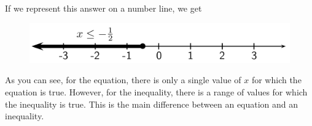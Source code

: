       \label{m39254*id157764}If we represent this answer on a number line, we get\par 
      \label{m39254*id157770}
    \setcounter{subfigure}{0}
	\begin{figure}[H] %
    \begin{center}
    \label{m39254*id157774!!!underscore!!!media}\label{m39254*id157774!!!underscore!!!printimage}\includegraphics[width=.8\columnwidth]{col11306.imgs/m39254_MG10C10_002.png} %
      \vspace{2pt}
    \vspace{.1in}
    \end{center}
 \end{figure}       
      \par 
      \label{m39254*id157780}As you can see, for the equation, there is only a single value of $x$ for which the equation is true. However, for the inequality, there is a range of values for which the inequality is true. This is the main difference between an equation and an inequality.\par 
